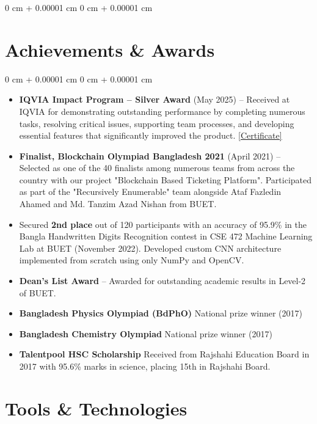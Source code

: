 \documentclass[10pt, letterpaper]{article}
\newenvironment{onecolentry}{
    \begin{adjustwidth}{
        0 cm + 0.00001 cm
    }{
        0 cm + 0.00001 cm
    }
}{
    \end{adjustwidth}
} %
\begin{document}
\begin{onecolentry}
    \section{Achievements \& Awards}

        \begin{onecolentry}
            \begin{itemize}
                \item \textbf{IQVIA Impact Program – Silver Award} (May 2025) -- Received at IQVIA for demonstrating outstanding performance by completing numerous tasks, resolving critical issues, supporting team processes, and developing essential features that significantly improved the product. \href{https://drive.google.com/file/d/1Vc4E2RoQEPmbfS56oLdUih-oJDBok9sP/view?usp=share_link}{[Certificate]}
                \item \textbf{Finalist, Blockchain Olympiad Bangladesh 2021} (April 2021) -- Selected as one of the 40 finalists among numerous teams from across the country with our project "Blockchain Based Ticketing Platform". Participated as part of the "Recursively Enumerable" team alongside Ataf Fazledin Ahamed and Md. Tanzim Azad Nishan from BUET.
                \item Secured \textbf{2nd place} out of 120 participants with an accuracy of 95.9\% in the Bangla Handwritten Digits Recognition contest in CSE 472 Machine Learning Lab at BUET (November 2022). Developed custom CNN architecture implemented from scratch using only NumPy and OpenCV.
                \item \textbf{Dean's List Award} -- Awarded for outstanding academic results in Level-2 of BUET.
                \item \textbf{Bangladesh Physics Olympiad (BdPhO)} National prize winner (2017)
                \item \textbf{Bangladesh Chemistry Olympiad} National prize winner (2017)
                \item \textbf{Talentpool HSC Scholarship} Received from Rajshahi Education Board in 2017 with 95.6\% marks in science, placing 15th in Rajshahi Board.
            \end{itemize}
            
        \end{onecolentry}

         \section{Tools \& Technologies}


\end{onecolentry}
\end{document}
